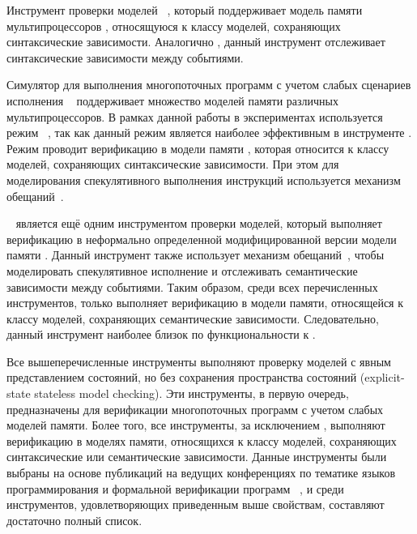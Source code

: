 Инструмент проверки моделей \textbf{\Nidhugg}~\cite{Abdulla-al:TACAS2015,Abdulla-al:CAV2016}, который поддерживает модель памяти мультипроцессоров \POWER, 
относящуюся к классу моделей, сохраняющих синтаксические зависимости.  
Аналогично \hmc, данный инструмент отслеживает синтаксические зависимости между событиями.

Симулятор для выполнения многопоточных программ с учетом слабых сценариев исполнения \textbf{\rmem}~\cite{RMEM} поддерживает множество моделей памяти различных мультипроцессоров. 
В рамках данной работы в экспериментах используется режим \PrmARM%
~\cite{Pulte-al:PLDI2019}, так как данный режим является 
наиболее эффективным в инструменте \rmem.
Режим \PrmARM проводит верификацию в модели памяти , 
которая относится к классу моделей, сохраняющих синтаксические зависимости. 
При этом для моделирования спекулятивного выполнения инструкций 
используется механизм обещаний~\cite{Kang-al:POPL17}.  

\textbf{\CDSChecker}~\cite{Norris-Demsky:OOPSLA2013} является 
ещё одним инструментом проверки моделей, который выполняет  верификацию 
в неформально определенной модифицированной версии модели памяти \CMM.
Данный инструмент также использует механизм обещаний~\cite{Kang-al:POPL17}, 
чтобы моделировать спекулятивное исполнение и отслеживать
семантические зависимости между событиями. 
Таким образом, среди всех перечисленных инструментов,
только \CDSChecker выполняет верификацию в модели памяти, 
относящейся к классу моделей, сохраняющих семантические зависимости. 
Следовательно, данный инструмент наиболее близок по функциональности к \wmc.

Все вышеперечисленные инструменты выполняют проверку 
моделей с явным представлением состояний, 
но без сохранения пространства состояний (explicit-state stateless model checking). 
Эти инструменты, в первую очередь, предназначены 
для верификации многопоточных программ с учетом слабых моделей памяти. 
Более того, все инструменты, за исключением \genmc, выполняют верификацию 
в моделях памяти, относящихся к классу моделей, 
сохраняющих синтаксические или семантические зависимости. 
Данные инструменты были выбраны на основе публикаций 
на ведущих конференциях по тематике языков программирования 
и формальной верификации программ%
~\cite{Kokologiannakis:PLDI2019,Kokologiannakis:CAD2021,Kokologiannakis-Vafeiadis:ASPLOS2020,
Abdulla-al:TACAS2015,Abdulla-al:CAV2016,Pulte-al:PLDI2019,Norris-Demsky:OOPSLA2013}, 
и среди инструментов, удовлетворяющих приведенным выше свойствам, 
составляют достаточно полный список.


